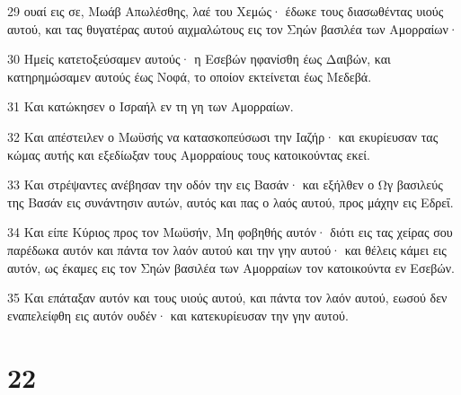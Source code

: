 \par 29 ουαί εις σε, Μωάβ Απωλέσθης, λαέ του Χεμώς· έδωκε τους διασωθέντας υιούς αυτού, και τας θυγατέρας αυτού αιχμαλώτους εις τον Σηών βασιλέα των Αμορραίων·
\par 30 Ημείς κατετοξεύσαμεν αυτούς· η Εσεβών ηφανίσθη έως Δαιβών, και κατηρημώσαμεν αυτούς έως Νοφά, το οποίον εκτείνεται έως Μεδεβά.
\par 31 Και κατώκησεν ο Ισραήλ εν τη γη των Αμορραίων.
\par 32 Και απέστειλεν ο Μωϋσής να κατασκοπεύσωσι την Ιαζήρ· και εκυρίευσαν τας κώμας αυτής και εξεδίωξαν τους Αμορραίους τους κατοικούντας εκεί.
\par 33 Και στρέψαντες ανέβησαν την οδόν την εις Βασάν· και εξήλθεν ο Ωγ βασιλεύς της Βασάν εις συνάντησιν αυτών, αυτός και πας ο λαός αυτού, προς μάχην εις Εδρεΐ.
\par 34 Και είπε Κύριος προς τον Μωϋσήν, Μη φοβηθής αυτόν· διότι εις τας χείρας σου παρέδωκα αυτόν και πάντα τον λαόν αυτού και την γην αυτού· και θέλεις κάμει εις αυτόν, ως έκαμες εις τον Σηών βασιλέα των Αμορραίων τον κατοικούντα εν Εσεβών.
\par 35 Και επάταξαν αυτόν και τους υιούς αυτού, και πάντα τον λαόν αυτού, εωσού δεν εναπελείφθη εις αυτόν ουδέν· και κατεκυρίευσαν την γην αυτού.

\chapter{22}

